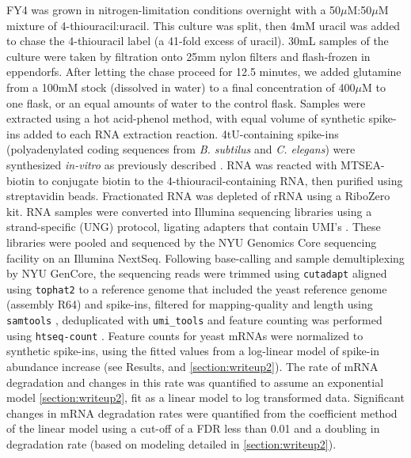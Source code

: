 FY4 was grown in nitrogen-limitation conditions overnight 
with a 50$\mu$M:50$\mu$M mixture of 4-thiouracil:uracil.
This culture was split, then 4mM uracil was added to chase the
4-thiouracil label (a 41-fold excess of uracil).
30mL samples of the culture were taken by filtration onto 25mm
nylon filters and flash-frozen in eppendorfs. 
After letting the chase proceed for 12.5 minutes, 
we added glutamine from 
a 100mM stock (dissolved in water) to a final concentration 
of 400$\mu$M to one flask, or an equal amounts of water to the 
control flask. 
Samples were extracted using a hot acid-phenol method,
with equal volume of synthetic spike-ins  added to each RNA 
extraction reaction.
4tU-containing spike-ins (polyadenylated coding sequences from
\textit{B. subtilus} and \textit{C. elegans}) were synthesized
\textit{in-vitro} as previously described
\parencite{neymotin2014determination}. 
RNA was reacted with 
MTSEA-biotin to conjugate biotin to the 4-thiouracil-containing
RNA, then purified using streptavidin beads.
Fractionated RNA was depleted of rRNA using a RiboZero kit.
RNA samples were converted into Illumina sequencing libraries using
a strand-specific (UNG) protocol, ligating adapters that contain
UMI's \parencite{hong2017method}.
These libraries were pooled and sequenced by the NYU Genomics
Core sequencing facility on an Illumina NextSeq.
Following base-calling and sample demultiplexing by NYU GenCore,
the sequencing reads were trimmed using 
\texttt{cutadapt} \parencite{martin2011cutadapt}
aligned using \texttt{tophat2} \parencite{kim2013tophat2} to a reference genome
that included the yeast reference genome (assembly R64) and
spike-ins, filtered for mapping-quality and length using
\texttt{samtools} \parencite{li2009sequence}, deduplicated 
with \texttt{umi\_tools} \parencite{smith2017umi}
and feature counting was performed using 
\texttt{htseq-count} \parencite{anders2015htseq}.
Feature counts for yeast mRNAs were normalized to synthetic spike-ins, 
using the fitted values from a log-linear model of spike-in abundance
increase (see Results, and \autoref{section:writeup2}).
The rate of mRNA degradation and changes in this rate
was quantified to assume an exponential model 
\autoref{section:writeup2}, fit as a linear model to log 
transformed data.
Significant changes in mRNA degradation rates were quantified from
the coefficient method of the linear model using a cut-off of a FDR 
\parencite{storey2015qvalue} less than 0.01 and a doubling in degradation
rate (based on modeling detailed in \autoref{section:writeup2}).

